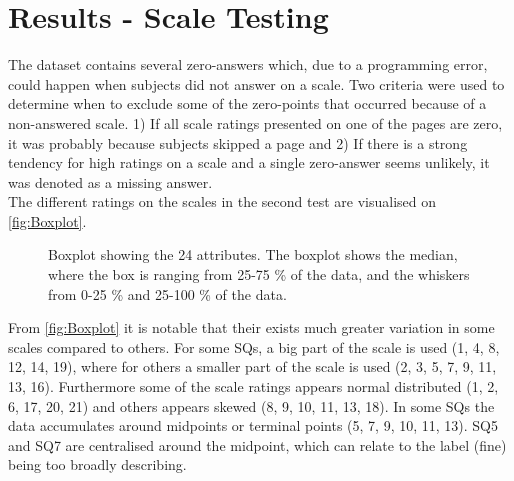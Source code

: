 \section{Results - Scale Testing}
\label{ResultsScaleTesting}
%
The dataset contains several zero-answers which, due to a programming error, could happen when subjects did not answer on a scale. Two criteria were used to determine when to exclude some of the zero-points that occurred because of a non-answered scale. 1) If all scale ratings presented on one of the pages are zero, it was probably because subjects skipped a page and 2) If there is a strong tendency for high ratings on a scale and a single zero-answer seems unlikely, it was denoted as a missing answer.\\

\noindent
The different ratings on the scales in the second test are visualised on \autoref{fig:Boxplot}.
%
%

\begin{figure}[!b]
	\centering
	\caption{Boxplot showing the 24 attributes. The boxplot shows the median, where the box is ranging from 25-75 \% of the data, and the whiskers from 0-25 \% and 25-100 \% of the data.}
\end{figure}

%
From \autoref{fig:Boxplot} it is notable that their exists much greater variation in some scales compared to others. For some SQs, a big part of the scale is used (1, 4, 8, 12, 14, 19), where for others a smaller part of the scale is used (2, 3, 5, 7, 9, 11, 13, 16). Furthermore some of the scale ratings appears normal distributed (1, 2, 6, 17, 20, 21) and others appears skewed (8, 9, 10, 11, 13, 18). In some SQs the data accumulates around midpoints or terminal points (5, 7, 9, 10, 11, 13). SQ5 and SQ7 are centralised around the midpoint, which can relate to the label (fine) being too broadly describing. \\ 

